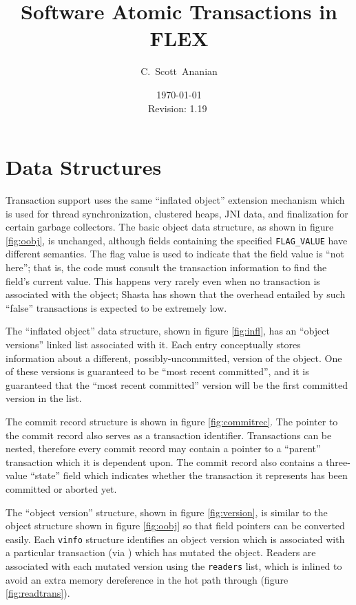 \documentclass[11pt,notitlepage]{article}
\author{C.~Scott~Ananian}
\title{Software Atomic Transactions in FLEX}
\date{\today \\ $ $Revision: 1.19 $ $}
\begin{document}

\maketitle
\section{Data Structures}

Transaction support uses the same ``inflated object'' extension
mechanism which is used for thread synchronization, clustered heaps,
JNI data, and finalization for certain garbage collectors.
The basic object data structure, as shown in figure \ref{fig:oobj}, is
unchanged, although fields containing the specified
\texttt{FLAG\_VALUE} have different semantics.  The flag value is used
to indicate that the field value is ``not here''; that is, the code
must consult the transaction information to find the field's current
value.  This happens very rarely even when no transaction is
associated with the object; Shasta \cite{scales96:shasta} has shown that the
overhead entailed by such ``false'' transactions is expected to be
extremely low.

The ``inflated object'' data structure, shown in figure
\ref{fig:infl}, has an ``object versions'' linked list associated with
it.  Each entry conceptually stores information about a different,
possibly-uncommitted, version of the object.  One of these versions is
guaranteed to be ``most recent committed'', and it is guaranteed that
the ``most recent committed'' version will be the first committed
version in the list.

The commit record structure is shown in figure \ref{fig:commitrec}.
The pointer to the commit record also serves as a transaction
identifier.  Transactions can be nested, therefore every commit record
may contain a pointer to a ``parent'' transaction which it is
dependent upon.  The commit record also contains a three-value
``state'' field which indicates whether the transaction it represents
has been committed or aborted yet.

The ``object version'' structure, shown in figure
\ref{fig:version}, is similar to the object structure shown in
figure \ref{fig:oobj} so that field pointers can be converted easily.
Each \texttt{vinfo} structure identifies an object version which is
associated with a particular transaction (via ) which
has mutated the object.  Readers are associated with each mutated
version using the \texttt{readers} list, which is inlined to avoid an
extra memory dereference in the hot path through 
(figure \ref{fig:readtrans}).
\end{document}
